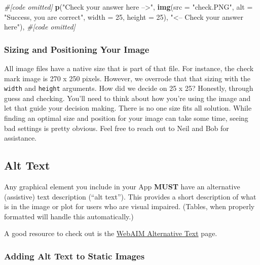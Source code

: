 \documentclass[
]{book}
\newenvironment{Shaded}{\begin{snugshade}}{\end{snugshade}}
\newcommand{\CommentTok}[1]{\textcolor[rgb]{0.56,0.35,0.01}{\textit{#1}}}
\newcommand{\DataTypeTok}[1]{\textcolor[rgb]{0.13,0.29,0.53}{#1}}
\newcommand{\DecValTok}[1]{\textcolor[rgb]{0.00,0.00,0.81}{#1}}
\newcommand{\KeywordTok}[1]{\textcolor[rgb]{0.13,0.29,0.53}{\textbf{#1}}}
\newcommand{\NormalTok}[1]{#1}
\newcommand{\StringTok}[1]{\textcolor[rgb]{0.31,0.60,0.02}{#1}}
\begin{document}
\begin{Shaded}
\begin{Highlighting}[]
\CommentTok{#[code omitted]}
\KeywordTok{p}\NormalTok{(}\StringTok{"Check your answer here -->"}\NormalTok{,}
  \KeywordTok{img}\NormalTok{(}\DataTypeTok{src =} \StringTok{"check.PNG"}\NormalTok{,}
      \DataTypeTok{alt =} \StringTok{"Success, you are correct"}\NormalTok{,}
      \DataTypeTok{width =} \DecValTok{25}\NormalTok{, }\DataTypeTok{height =} \DecValTok{25}\NormalTok{),}
  \StringTok{"<-- Check your answer here"}\NormalTok{),}
\CommentTok{#[code omitted]}
\end{Highlighting}
\end{Shaded}

\hypertarget{sizing-and-positioning-your-image}{%
\subsubsection{Sizing and Positioning Your Image}\label{sizing-and-positioning-your-image}}

All image files have a native size that is part of that file. For instance, the check mark image is 270 x 250 pixels. However, we overrode that that sizing with the \texttt{width} and \texttt{height} arguments. How did we decide on 25 x 25? Honestly, through guess and checking. You'll need to think about how you're using the image and let that guide your decision making. There is no one size fits all solution. While finding an optimal size and position for your image can take some time, seeing bad settings is pretty obvious. Feel free to reach out to Neil and Bob for assistance.

\hypertarget{alt-text}{%
\subsection{Alt Text}\label{alt-text}}

Any graphical element you include in your App \textbf{MUST} have an alternative (assistive) text description (``alt text''). This provides a short description of what is in the image or plot for users who are visual impaired. (Tables, when properly formatted will handle this automatically.)

A good resource to check out is the \href{https://webaim.org/techniques/alttext/\#basics}{WebAIM Alternative Text} page.

\hypertarget{adding-alt-text-to-static-images}{%
\subsubsection{Adding Alt Text to Static Images}\label{adding-alt-text-to-static-images}}
\end{document}
